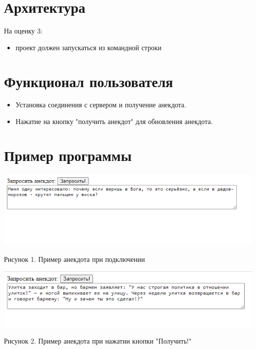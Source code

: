 \documentclass[a4paper]{article}
\begin{document}
\section{Архитектура}
На оценку 3:
\begin{itemize}
\item проект должен запускаться из командной строки

\end{itemize}


\section{Функционал пользователя}
\begin{itemize}
\item Установка соединения с сервером и получение анекдота.
\item Нажатие на кнопку "получить анекдот" для обновления анекдота.

\end{itemize}


\section{Пример программы}
\begin{center}
\includegraphics[scale = 0.6]{humor1.png}

Рисунок 1. Пример анекдота при подключении

\hfill \break
\hfill \break
\hfill \break

\includegraphics[scale = 0.9]{humor2.png}

Рисунок 2. Пример анекдота при нажатии кнопки "Получить!"
\end{center}
\end{document}
